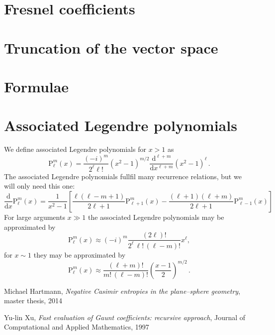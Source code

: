 \documentclass[superscriptaddress,prb]{revtex4-1}
\newcommand{\imag}{i} %
\newcommand{\Plm}[2]{{\text{P}_{#1}^{#2}}}
\begin{document}
\section{Fresnel coefficients}
\section{Truncation of the vector space}

\appendix

\section{Formulae}


\section{Associated Legendre polynomials}

We define associated Legendre polynomials for $x>1$ as
\begin{equation}
\Plm{\ell}{m}(x) = \frac{(-\imag)^m}{2^\ell \ell!} \left(x^2-1\right)^{m/2} \frac{\mathrm{d}^{\ell+m}}{\mathrm{d}x^{\ell+m}} \left(x^2-1\right)^\ell \,.
\end{equation}
The associated Legendre polynomials fullfil many recurrence relations, but we will only need this one:
\begin{equation}
\label{appendix:dPlm}
\frac{\mathrm{d}}{\mathrm{d}x} \Plm{\ell}{m}(x) = \frac{1}{x^2-1} \left[
\frac{\ell(\ell-m+1)}{2\ell+1} \Plm{\ell+1}{m}(x)
-\frac{(\ell+1)(\ell+m)}{2\ell+1} \Plm{\ell-1}{m}(x)
\right]
\end{equation}
For large arguments $x\gg 1$ the associated Legendre polynomials may be approximated by
\begin{equation}
\label{appendix:Plm_gg}
\Plm{\ell}{m}(x) \approx (-\imag)^m \frac{(2\ell)!}{2^\ell \, \ell! \, (\ell-m)!} x^\ell,
\end{equation}
for $x\sim1$ they may be approximated by
\begin{equation}
\label{appendix:Plm_1}
\Plm{\ell}{m}(x) \approx \frac{(\ell+m)!}{m! \, (\ell-m)!} \left(\frac{x-1}{2}\right)^{m/2} \,.
\end{equation}



\begin{thebibliography}{99}

  Michael Hartmann,
  \emph{Negative Casimir entropies in the plane–sphere geometry}, master thesis, 2014

  Yu-lin Xu,
  \emph{Fast evaluation of Gaunt coefficients: recursive approach}, Journal of Computational and Applied Mathematics, 1997

\end{thebibliography}
\end{document}
